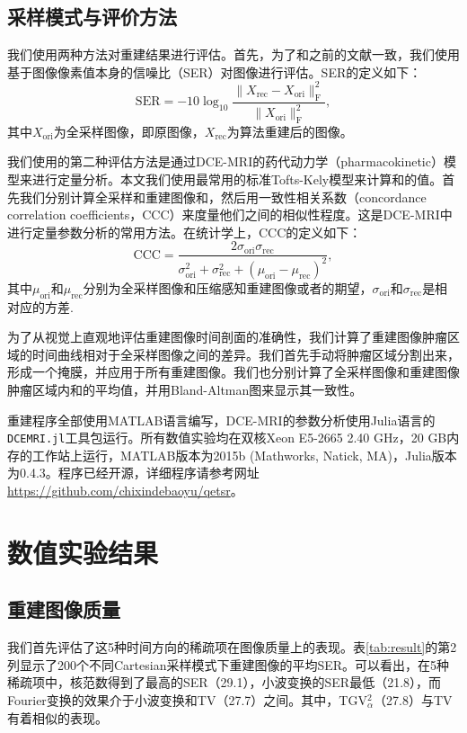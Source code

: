 \subsection{采样模式与评价方法}
我们使用两种方法对重建结果进行评估。首先，为了和之前的文献一致，我们使用基于图像像素值本身的信噪比（SER）对图像进行评估。SER的定义如下：
\begin{equation}
\mathrm{SER} = -10 \log_{10}\frac{\|X_\mathrm{rec}-X_\mathrm{ori}\|_\mathrm{F}^2}{\|X_\mathrm{ori}\|_\mathrm{F}^2},
\end{equation}
其中$X_{\mathrm{ori}}$为全采样图像，即原图像，$X_{\mathrm{rec}}$为算法重建后的图像。

我们使用的第二种评估方法是通过DCE-MRI的药代动力学（pharmacokinetic）模型来进行定量分析。本文我们使用最常用的标准Tofts-Kely模型\cite{tofts}来计算\kt 和\Ve 的值。首先我们分别计算全采样和重建图像\kt 和\Ve，然后用一致性相关系数（concordance correlation coefficients，CCC）来度量他们之间的相似性程度。这是DCE-MRI中进行定量参数分析的常用方法。在统计学上，CCC的定义如下：
\begin{equation}
\mathrm{CCC} = \frac{2\sigma_\mathrm{ori} \sigma_\mathrm{rec}}{\sigma_\mathrm{ori}^2+\sigma_\mathrm{rec}^2+(\mu_\mathrm{ori}-\mu_\mathrm{rec})^2},
\end{equation}
其中$\mu_\mathrm{ori}$和$\mu_\mathrm{rec}$分别为全采样图像和压缩感知重建图像\kt 或者\Ve 的期望，$\sigma_\mathrm{ori}$和$\sigma_\mathrm{rec}$是相对应的方差.

为了从视觉上直观地评估重建图像时间剖面的准确性，我们计算了重建图像肿瘤区域的时间曲线相对于全采样图像之间的差异。我们首先手动将肿瘤区域分割出来，形成一个掩膜，并应用于所有重建图像。我们也分别计算了全采样图像和重建图像肿瘤区域内\kt 和\Ve 的平均值，并用Bland-Altman图来显示其一致性。

重建程序全部使用MATLAB语言编写，DCE-MRI的参数分析使用Julia语言的\texttt{DCEMRI.jl}\cite{Smith2015}工具包运行。所有数值实验均在双核Xeon E5-2665 2.40 GHz，20 GB内存的工作站上运行，MATLAB版本为2015b (Mathworks, Natick, MA)，Julia版本为0.4.3。程序已经开源，详细程序请参考网址\url{https://github.com/chixindebaoyu/qetsr}。

\section{数值实验结果}
\subsection{重建图像质量}
我们首先评估了这5种时间方向的稀疏项在图像质量上的表现。表\ref{tab:result}的第2列显示了200个不同Cartesian采样模式下重建图像的平均SER。可以看出，在5种稀疏项中，核范数得到了最高的SER（29.1），小波变换的SER最低（21.8），而Fourier变换的效果介于小波变换和TV（27.7）之间。其中，TGV$_\alpha^2$（27.8）与TV有着相似的表现。

